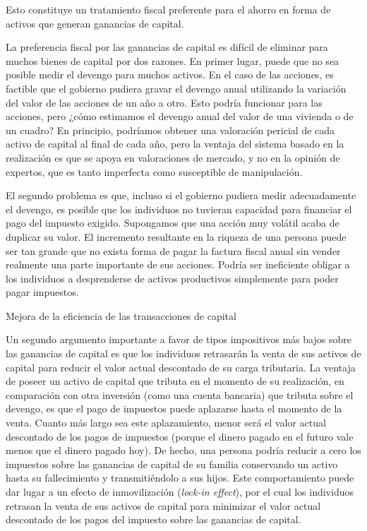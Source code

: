 \documentclass[10pt,a4paper]{article}
\begin{document}
{Esto constituye un tratamiento fiscal preferente para el ahorro en forma de activos que generan ganancias de capital.

La preferencia fiscal por las ganancias de capital es difícil de eliminar para muchos bienes de capital por dos razones. En primer lugar, puede que no sea posible medir el devengo para muchos activos. En el caso de las acciones, es factible que el gobierno pudiera gravar el devengo anual utilizando la variación del valor de las acciones de un año a otro. Esto podría funcionar para las acciones, pero ¿cómo estimamos el devengo anual del valor de una vivienda o de un cuadro? En principio, podríamos obtener una valoración pericial de cada activo de capital al final de cada año, pero la ventaja del sistema basado en la realización es que se apoya en valoraciones de mercado, y no en la opinión de expertos, que es tanto imperfecta como susceptible de manipulación.

El segundo problema es que, incluso si el gobierno pudiera medir adecuadamente el devengo, es posible que los individuos no tuvieran capacidad para financiar el pago del impuesto exigido. Supongamos que una acción muy volátil acaba de duplicar su valor. El incremento resultante en la riqueza de una persona puede ser tan grande que no exista forma de pagar la factura fiscal anual sin vender realmente una parte importante de sus acciones. Podría ser ineficiente obligar a los individuos a desprenderse de activos productivos simplemente para poder pagar impuestos.

Mejora de la eficiencia de las transacciones de capital

Un segundo argumento importante a favor de tipos impositivos más bajos sobre las ganancias de capital es que los individuos retrasarán la venta de sus activos de capital para reducir el valor actual descontado de su carga tributaria. La ventaja de poseer un activo de capital que tributa en el momento de su realización, en comparación con otra inversión (como una cuenta bancaria) que tributa sobre el devengo, es que el pago de impuestos puede aplazarse hasta el momento de la venta. Cuanto más largo sea este aplazamiento, menor será el valor actual descontado de los pagos de impuestos (porque el dinero pagado en el futuro vale menos que el dinero pagado hoy). De hecho, una persona podría reducir a cero los impuestos sobre las ganancias de capital de su familia conservando un activo hasta su fallecimiento y transmitiéndolo a sus hijos. Este comportamiento puede dar lugar a un efecto de inmovilización (\textit{lock-in effect}), por el cual los individuos retrasan la venta de sus activos de capital para minimizar el valor actual descontado de los pagos del impuesto sobre las ganancias de capital.

}
\end{document}
